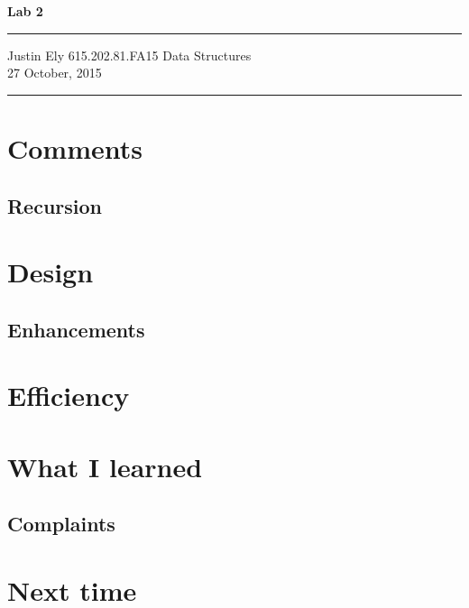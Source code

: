 \documentclass[a4paper,12pt]{article}
\begin{document}
\begin{flushright}

\vspace{1.1cm}

{\bf\Huge Lab 2}

\rule{0.25\linewidth}{0.5pt}

\vspace{0.5cm}
Justin Ely
\linebreak
\newline
\footnotesize{615.202.81.FA15 Data Structures \\}
\vspace{0.5cm}
27 October, 2015
\end{flushright}

\noindent\rule{\linewidth}{1.0pt}


\section{Comments}

\subsection{Recursion}


\section{Design}

\subsection{Enhancements}


\section{Efficiency}


\section{What I learned}

\subsection{Complaints}


\section{Next time}

\end{document}
